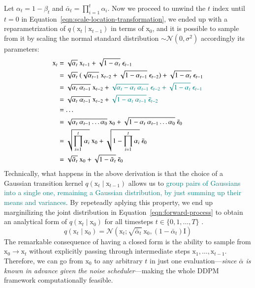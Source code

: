 \noindent Let $\alpha_{t}=1 - \beta_{t}$ and $\bar{\alpha}_{t}=\prod_{i=1}^{t}\alpha_{i}$. Now we proceed to unwind the $t$ index until $t=0$ in Equation~\ref{eqn:scale-location-transformation}, we ended up with a reparametrization of $q(\mathrm{x}_{t}\mid\mathrm{x}_{t-1})$ in terms of $\mathrm{x}_{0}$, and it is possible to sample from it by scaling the normal standard distribution $\sim \mathcal{N}(0, \sigma^2)$ accordingly its parameters:
\begin{equation}\label{eqn:reparameterization-trick}
    \begin{split}
            \mathrm{x}_{t} & = \sqrt{\alpha_{t}}~\mathrm{x}_{t-1} + \sqrt{1-\alpha_{t}}~\epsilon_{t-1} \\
             & = \sqrt{\alpha_{t}}~(\sqrt{\alpha_{t-1}}~\mathrm{x}_{t-2} + \sqrt{1 - \alpha_{t-1}}~\epsilon_{t-2}) + \sqrt{1-\alpha_{t}}~\epsilon_{t-1} \\
             &= \sqrt{\alpha_{t}~\alpha_{t-1}}~\mathrm{x}_{t-2} + \textcolor{teal}{\sqrt{\alpha_{t} - \alpha_{t}~\alpha_{t-1}}~\epsilon_{t-2} + \sqrt{1-\alpha_{t}}~\epsilon_{t-1}} \\
             &= \sqrt{\alpha_{t}~\alpha_{t-1}}~\mathrm{x}_{t-2} + \textcolor{teal}{\sqrt{1 - \alpha_{t}~\alpha_{t-1}}~\bar{\epsilon}_{t-2}} \\
             &= \dots \\
             &= \sqrt{\alpha_{t}~\alpha_{t-1}\dots\alpha_{0}}~\mathrm{x}_{0} + \sqrt{1 - \alpha_{t}~\alpha_{t-1}\dots\alpha_{0}}~\bar{\epsilon}_{0} \\
             &= \sqrt{\prod_{i=1}^{t}\alpha_{i}}~\mathrm{x}_{0} + \sqrt{1 - \prod_{i=1}^{t}\alpha_{i}}~\bar{\epsilon}_{0} \\
             &= \sqrt{\bar{\alpha}_{t}}~\mathrm{x}_{0} + \sqrt{1 - \bar{\alpha}_
             {t}}~\bar{\epsilon}_{0} 
    \end{split}
\end{equation}
Technically, what happens in the above derivation is that the choice of a Gaussian transition kernel $q(\mathrm{x}_{t}\mid\mathrm{x}_{t-1})$ allows us to
\textcolor{teal}{group pairs of Gaussians into a single one, remaining a Gaussian distribution, by just summing up their means and variances}.  By repeteadly aplying this property, we end up marginilizing the joint distribution in Equation~\ref{eqn:forward-process} to obtain an analytical form of $q(\mathrm{x}_{t}\mid \mathrm{x}_{0})$ for all timesteps $t\in\{0, 1, \dots, T\}$ . 
\begin{equation}\label{eqn:marginilize_q_xt_on_x0}
    q(\mathrm{x}_{t}\mid \mathrm{x}_{0}) = \mathcal{N}(\mathrm{x}_{t};\sqrt{\bar{\alpha}_{t}}~\mathrm{x}_{0}, (1-\bar{\alpha}_{t})\mathrm{I})
\end{equation}
The remarkable consequence of having a closed form is the ability to sample from $\mathrm{x}_{0}\rightarrow \mathrm{x}_{t}$ without explicitly passing through intermediate steps $\mathrm{x}_{1}, \dots, \mathrm{x}_{t-1}$. Therefore, we can go from $\mathrm{x}_{0}$ to any arbitrary $t$ in just one evaluation---\textit{since $\bar{\alpha}$ is known in advance given the noise scheduler}---making the whole DDPM framework computationally feasible.

